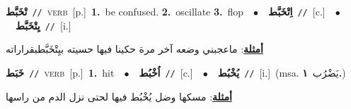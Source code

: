 \documentclass[10pt,a4paper,twoside]{article} %
\begin{document}
\begin{multicols}{2}
{\setlength\topsep{0pt}\textbf{\foreignlanguage{arabic}{تْخَبَّط}}\ {\color{gray}\texttt{//}\color{black}}\ \textsc{verb}\ [p.]\ \textbf{1.}~be confused.  \textbf{2.}~oscillate  \textbf{3.}~flop\ \ $\bullet$\ \ \setlength\topsep{0pt}\textbf{\foreignlanguage{arabic}{اِتْخَبَّط}}\ {\color{gray}\texttt{//}\color{black}}\ [c.]\ \ $\bullet$\ \ \setlength\topsep{0pt}\textbf{\foreignlanguage{arabic}{يِتْخَبَّط}}\ {\color{gray}\texttt{//}\color{black}}\ [i.]\  \begin{flushright}\color{gray}\foreignlanguage{arabic}{\textbf{\underline{\foreignlanguage{arabic}{أمثلة}}}: ماعجبني وضعه آخر مرة حكينا فيها حسيته بيِتْخَبَّطبقراراته}\end{flushright}\color{black}} \vspace{2mm}

{\setlength\topsep{0pt}\textbf{\foreignlanguage{arabic}{خَبَط}}\ {\color{gray}\texttt{//}\color{black}}\ \textsc{verb}\ [p.]\ \textbf{1.}~hit\ \ $\bullet$\ \ \setlength\topsep{0pt}\textbf{\foreignlanguage{arabic}{اُخْبُط}}\ {\color{gray}\texttt{//}\color{black}}\ [c.]\ \ $\bullet$\ \ \setlength\topsep{0pt}\textbf{\foreignlanguage{arabic}{يُخْبُط}}\ {\color{gray}\texttt{//}\color{black}}\ [i.]\ \color{gray}(msa. \foreignlanguage{arabic}{يَضْرُب}~\foreignlanguage{arabic}{\textbf{١.}})\color{black}\  \begin{flushright}\color{gray}\foreignlanguage{arabic}{\textbf{\underline{\foreignlanguage{arabic}{أمثلة}}}: مسكها وضل يُخْبُط فيها لحتى نزل الدم من راسها}\end{flushright}\color{black}} \vspace{2mm}


\end{multicols}
\end{document}
